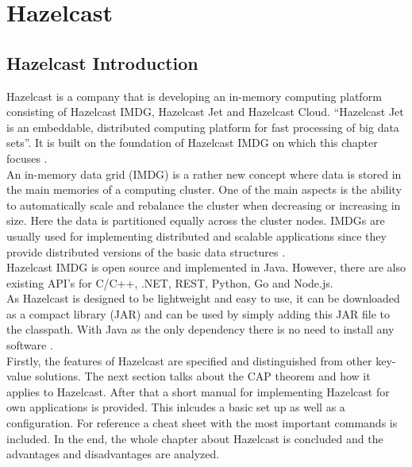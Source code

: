 
\chapter{Hazelcast}

\section{Hazelcast Introduction}

Hazelcast is a company that is developing an in-memory computing platform consisting of Hazelcast IMDG, Hazelcast Jet and Hazelcast Cloud. “Hazelcast Jet is an embeddable, distributed computing platform for fast processing of big data sets”. It is built on the foundation of Hazelcast IMDG on which this chapter focuses \cite{hazelcast}.\\
An in-memory data grid (IMDG) is a rather new concept where data is stored in the main memories of a computing cluster. One of the main aspects is the ability to automatically scale and rebalance the cluster when decreasing or increasing in size. Here the data is partitioned equally across the cluster nodes. IMDGs are usually used for implementing distributed and scalable applications since they provide distributed versions of the basic data structures \cite{tasci2015}. \\
Hazelcast IMDG is open source and implemented in Java. However, there are also existing API’s for C/C++, .NET, REST, Python, Go and Node.js. \\
As Hazelcast is designed to be lightweight and easy to use, it can be downloaded as a compact library (JAR) and can be used by simply adding this JAR file to the classpath. With Java as the only dependency there is no need to install any software \cite{hazelcastmanual}. \\
Firstly, the features of Hazelcast are specified and distinguished from other key-value solutions. The next section talks about the CAP theorem and how it applies to Hazelcast. After that a short manual for implementing Hazelcast for own applications is provided. This inlcudes a basic set up as well as a configuration. For reference a cheat sheet with the most important commands is included. In the end, the whole chapter about Hazelcast is concluded and the advantages and disadvantages are analyzed. 

